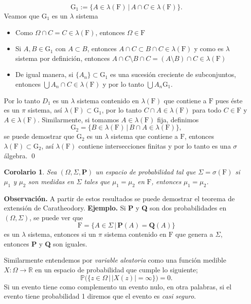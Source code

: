 \documentclass[letterpaper]{article}
\newtheorem{cor}[teorema]{Corolario}
\newcommand{\prob}{\textbf{P}}
\newcommand{\eje}{{\newline \noindent \sc \textbf{Ejemplo. }}}
\newcommand{\obs}{{\newline \noindent \sc \textbf{Observación. }}}
\newcommand{\om}{\ensuremath{\Omega}}
\newcommand{\sig}{\ensuremath{\Sigma}}
\begin{document}
\[
    \mathrm{G}_{1}:=\{A\in\lambda(\mathrm{F})\,\vert\,A\cap C\in\lambda(\mathrm{F})\}.
\]
\noindent Veamos que \(\mathrm{G}_1\) es un \(\lambda\) sistema
\begin{itemize}
\item Como \(\om\cap C=C\in\lambda(\mathrm{F})\), entonces \(\om\in\mathrm{F}\)
\item Si \(A,B\in\mathrm{G}_1\) con \(A\subset B\), entonces \(A\cap C\subset B\cap C\in\lambda(\mathrm{F})\) y como es \(\lambda\) sistema por definición, entonces \(A\cap C\setminus B\cap C=(A\setminus B)\cap C\in\lambda(\mathrm{F})\)
\item De igual manera, si  \(\{A_n\}\subset\mathrm{G}_1\) es una sucesión creciente de subconjuntos, entonces \(\bigcup A_n\cap C\in\lambda(\mathrm{F})\) y por lo tanto \(\bigcup A_n\mathrm{G}_1\).
\end{itemize}
Por lo tanto \(D_1\) es un \(\lambda\) sistema contenido en \(\lambda(\mathrm{F})\) que contiene a \(\mathrm{F}\) pues éste es un \(\pi\) sistema, así \(\lambda(\mathrm{F})\subset\mathrm{G}_1\), por lo tanto \(C\cap A\in\lambda(\mathrm{F})\) para todo \(C\in\mathrm{F}\) y \(A\in\lambda(\mathrm{F})\). Similarmente, si tomamos \(A\in\lambda(\mathrm{F})\) fija, definimos
\[
    \mathrm{G}_2=\{B\in\lambda(\mathrm{F})\,\vert\,B\cap A\in\lambda(\mathrm{F})\},
\]
\noindent se puede demostrar que \(\mathrm{G}_2\) es un \(\lambda\) sistema que contiene a \(\mathrm{F}\), entonces \(\lambda(\mathrm{F})\subset\mathrm{G}_2\), así \(\lambda(\mathrm{F})\) contiene intersecciones finitas y por lo tanto es una \(\sigma\) álgebra.
\qed\\
\begin{cor}
Sea $(\om,\sig,\prob)$ un espacio de probabilidad tal que $\sig=\sigma(\mathrm{F})$ si $\mu_1$ y $\mu_2$ son medidas en $\sig$ tales que $\mu_1=\mu_2$ en $\mathrm{F}$, entonces $\mu_1=\mu_2$.
\end{cor}
\obs A partir de estos resultados se puede demostrar el teorema de extensión de Caratheodory.
\eje Si \textbf{P} y \textbf{Q} son dos probabilidades en \((\Omega,\Sigma)\), se puede ver que
\[
    \mathrm{F}=\{A\in\Sigma\,\vert\,\textbf{P}(A)=\textbf{Q}(A)\}
\]
es un \(\lambda\) sistema, entonces si un \(\pi\) sistema contenido en \(\mathrm{F}\) que genera a \(\Sigma\), entonces \textbf{P} y \textbf{Q} son iguales.

Similarmente entendemos por \emph{variable aleatoria} como una función medible \(X:\Omega\rightarrow\mathbb{R}\) en un espacio de probabilidad que cumple lo siguiente;
\[
    \mathbb{P}\Big(\{z\in\Omega\,\vert\, |X(z)|=\infty\}\Big)=0.
\]
Si un evento tiene como complemento un evento nulo, en otra palabras, si el evento tiene probabilidad 1 diremos que el evento es \emph{casi seguro}.
\end{document}
